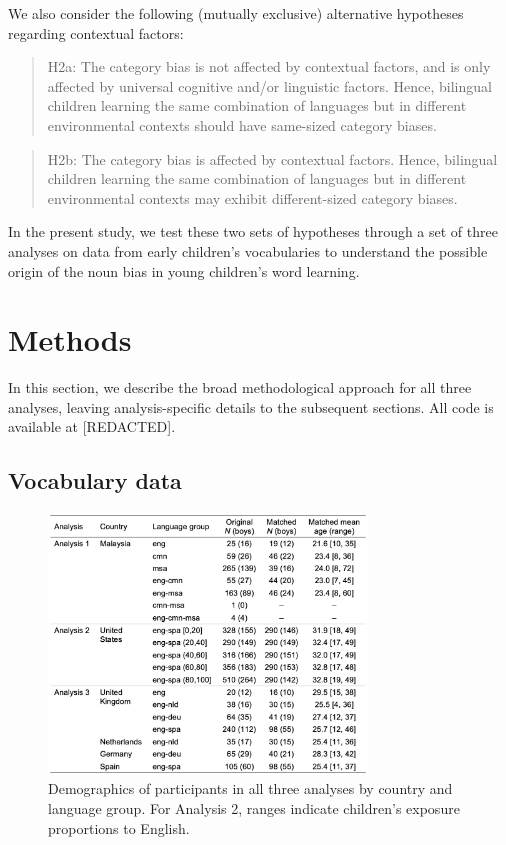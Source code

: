 \documentclass[10pt, letterpaper]{article}
\begin{document}
We also consider the following (mutually exclusive) alternative
hypotheses regarding contextual factors:

\begin{quote}
H2a: The category bias is not affected by contextual factors, and is
only affected by universal cognitive and/or linguistic factors. Hence,
bilingual children learning the same combination of languages but in
different environmental contexts should have same-sized category biases.
\end{quote}

\begin{quote}
H2b: The category bias is affected by contextual factors. Hence,
bilingual children learning the same combination of languages but in
different environmental contexts may exhibit different-sized category
biases.
\end{quote}

In the present study, we test these two sets of hypotheses through a set
of three analyses on data from early children's vocabularies to
understand the possible origin of the noun bias in young children's word
learning.

\section{Methods}\label{methods}

In this section, we describe the broad methodological approach for all
three analyses, leaving analysis-specific details to the subsequent
sections. All code is available at {[}REDACTED{]}.

\subsection{Vocabulary data}\label{vocabulary-data}

\begin{CodeChunk}
\begin{figure}[t]

{\centering \includegraphics[width=240pt]{figs/demogs} 

}

\caption[Demographics of participants in all three analyses by country and language group]{Demographics of participants in all three analyses by country and language group. For Analysis 2, ranges indicate children's exposure proportions to English.}\label{fig:demogs}
\end{figure}
\end{CodeChunk}
\end{document}
